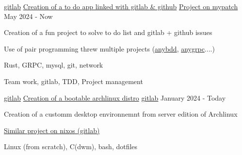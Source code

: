 

\begin{cventries}

	\cventry
	{\href{https://gitlab.com/patchme/any}{gitlab}} %
    {\href{https://gitlab.com/patchme/any}{Creation  of a to do app linked with gitlab \& github}} %
	{\href{https://mypatch.fr/projects/any}{Project on mypatch}} %
	{May 2024 - Now} %
	{
		\begin{cvitems} %
			\item {Creation of a fun project to solve to do list and gitlab + github issues}
			\item {Use of pair programming threw multiple projects (\href{https://gitlab.com/patchme/anybdd}{anybdd}, \href{https://gitlab.com/patchme/anygrpc}{anygrpc}....)}
		\end{cvitems}
	}
	{
		\begin{cvitemsskills} %
			\item {Rust, GRPC, mysql, git, network }
			\item {Team work, gitlab, TDD, Project management}
		\end{cvitemsskills}
	}

	\cventry
	{\href{https://gitlab.com/patchme/}{gitlab}} %
	{\href{https://gitlab.com/patchme/oh-my-arch}{Creation of a bootable archlinux distro}}
	{\href{https://gitlab.com/patchme/oh-my-arch}{gitlab}} %
	{January 2024 - Today} %
	{
		\begin{cvitems} %
			\item {Creation of a customm desktop environnemnt from server edition of Archlinux}
			\item {\href{https://gitlab.com/patchme/any}{Similar project on nixos (gitlab)}}
		\end{cvitems}
	}
	{
		\begin{cvitemsskills} %
			\item {Linux (from scratch), C(dwm), bash, dotfiles}
		\end{cvitemsskills}
	}



\end{cventries}
